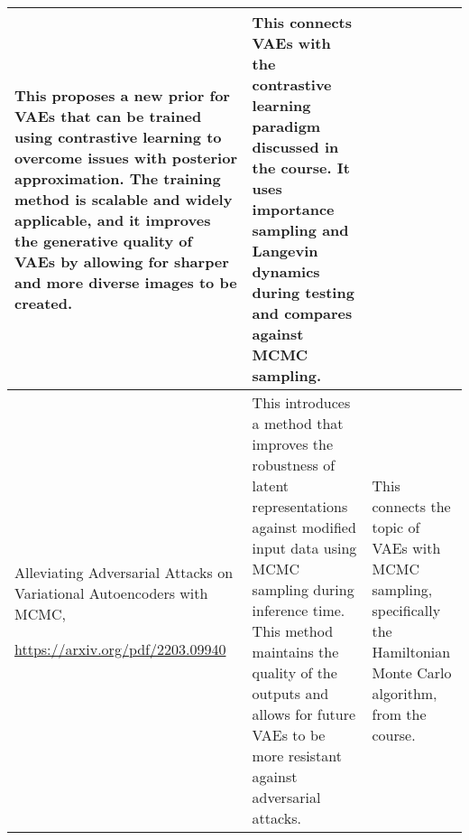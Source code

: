 \documentclass{article}
\begin{document}
\begin{table}[ht]
\begin{tabularx}{\textwidth}{p{3.3cm}XX}
    This proposes a new prior for VAEs that can be trained using contrastive learning to overcome issues with posterior approximation. The training method is scalable and widely applicable, and it improves the generative quality of VAEs by allowing for sharper and more diverse images to be created. &
    This connects VAEs with the contrastive learning paradigm discussed in the course. It uses importance sampling and Langevin dynamics during testing and compares against MCMC sampling. \\ \hline
    Alleviating Adversarial Attacks on Variational Autoencoders with MCMC, \par \url{https://arxiv.org/pdf/2203.09940} &
    This introduces a method that improves the robustness of latent representations against modified input data using MCMC sampling during inference time. This method maintains the quality of the outputs and allows for future VAEs to be more resistant against adversarial attacks. &
    This connects the topic of VAEs with MCMC sampling, specifically the Hamiltonian Monte Carlo algorithm, from the course. \\ \bottomrule
\end{tabularx}
\end{table}
\end{document}
